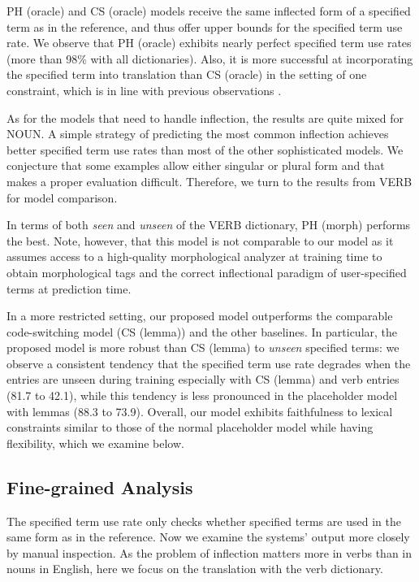 PH (oracle) and CS (oracle) models receive the same inflected form of a specified term as in the reference, and thus offer upper bounds for the specified term use rate.
We observe that PH (oracle) exhibits nearly perfect specified term use rates (more than 98\% with all dictionaries).
Also, it is more successful at incorporating the specified term into translation than CS (oracle) in the setting of one constraint, which is in line with previous observations \citep{song-etal-2019-code}.

As for the models that need to handle inflection, the results are quite mixed for NOUN.
A simple strategy of predicting the most common inflection achieves better specified term use rates than most of the other sophisticated models.
We conjecture that some examples allow either singular or plural form and that makes a proper evaluation difficult. Therefore, we turn to the results from VERB for model comparison.

In terms of both {\it seen} and {\it unseen} of the VERB dictionary, PH (morph) performs the best.
Note, however, that this model is not comparable to our model as it assumes access to a high-quality morphological analyzer at training time to obtain morphological tags and the correct inflectional paradigm of user-specified terms at prediction time.

In a more restricted setting, our proposed model outperforms the comparable code-switching model (CS (lemma)) and the other baselines.
In particular, the proposed model is more robust than CS (lemma) to {\it unseen} specified terms: we observe a consistent tendency that the specified term use rate degrades when the entries are unseen during training especially with CS (lemma) and verb entries (81.7 to 42.1), while this tendency is less pronounced in the placeholder model with lemmas (88.3 to 73.9).
Overall, our model exhibits faithfulness to lexical constraints similar to those of the normal placeholder model while having flexibility, which we examine below.

\subsection{Fine-grained Analysis}
The specified term use rate only checks whether specified terms are used in the same form as in the reference. Now we examine the systems' output more closely by manual inspection.
As the problem of inflection matters more in verbs than in nouns in English, here we focus on the translation with the verb dictionary.

